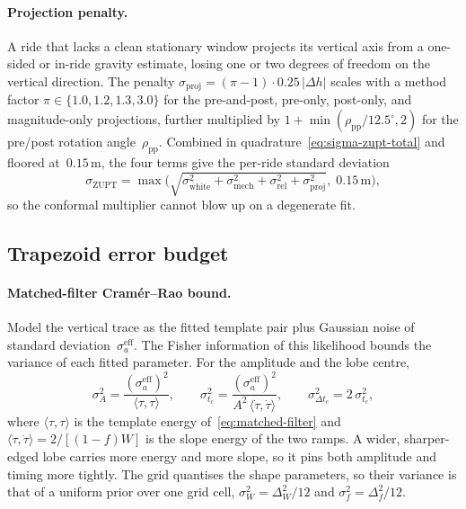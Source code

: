 \documentclass[manuscript,review,screen]{acmart}
\begin{document}
\paragraph{Projection penalty.}
A ride that lacks a clean stationary window projects its vertical
axis from a one-sided or in-ride gravity estimate, losing one or two
degrees of freedom on the vertical direction.  The penalty
$\sigma_{\mathrm{proj}}=(\pi-1)\cdot 0.25\,|\Delta h|$ scales with a
method factor $\pi\in\{1.0,1.2,1.3,3.0\}$ for the pre-and-post,
pre-only, post-only, and magnitude-only projections, further
multiplied by $1+\min(\rho_{\mathrm{pp}}/12.5^{\circ},2)$ for the
pre/post rotation angle~$\rho_{\mathrm{pp}}$.  Combined in
quadrature~\eqref{eq:sigma-zupt-total} and floored at~$0.15\,\mathrm{m}$,
the four terms give the per-ride standard deviation
\[
  \sigma_{\mathrm{ZUPT}}
  =\max\!\Big(
    \sqrt{\sigma_{\mathrm{white}}^{2}+\sigma_{\mathrm{mech}}^{2}
          +\sigma_{\mathrm{rel}}^{2}+\sigma_{\mathrm{proj}}^{2}},\;
    0.15\,\mathrm{m}\Big),
\]
so the conformal multiplier cannot blow up on a degenerate fit.

\subsection{Trapezoid error budget}
\label{app:pred-trap-error}

\paragraph{Matched-filter Cram\'er--Rao bound.}
Model the vertical trace as the fitted template pair plus Gaussian
noise of standard deviation~$\sigma_a^{\mathrm{eff}}$.  The Fisher
information of this likelihood bounds the variance of each fitted
parameter.  For the amplitude and the lobe centre,
\begin{equation}
  \sigma_A^{2}=\frac{(\sigma_a^{\mathrm{eff}})^{2}}{\langle\tau,\tau\rangle},
  \qquad
  \sigma_{t_c}^{2}
   =\frac{(\sigma_a^{\mathrm{eff}})^{2}}{A^{2}\,\langle\dot\tau,\dot\tau\rangle},
  \qquad
  \sigma_{\Delta t_c}^{2}=2\,\sigma_{t_c}^{2},
  \label{eq:crb}
\end{equation}
where $\langle\tau,\tau\rangle$ is the template energy
of~\eqref{eq:matched-filter} and
$\langle\dot\tau,\dot\tau\rangle=2/[(1-f)W]$ is the slope energy of
the two ramps.  A wider, sharper-edged lobe carries more energy and
more slope, so it pins both amplitude and timing more tightly.  The
grid quantises the shape parameters, so their variance is that of a
uniform prior over one grid cell, $\sigma_W^{2}=\Delta_W^{2}/12$ and
$\sigma_f^{2}=\Delta_f^{2}/12$.
\end{document}
